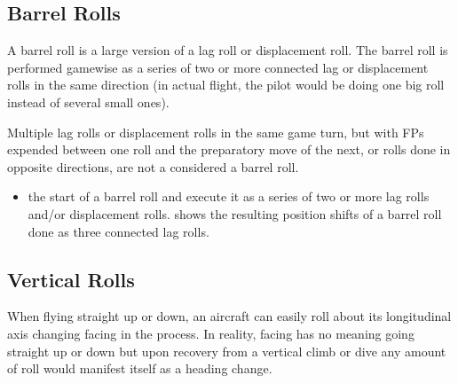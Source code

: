 \subsection{Barrel Rolls}


A barrel roll is a large version of a lag roll or displacement roll. The barrel roll is performed gamewise as a series of two or more connected lag or displacement rolls in the same direction (in actual flight, the pilot would be doing one big roll instead of several small ones).

Multiple lag rolls or displacement rolls in the same game turn, but with FPs expended between one roll and the preparatory move of the next, or rolls done in opposite directions, are not a considered a barrel roll.

\begin{itemize}
    \item{}  the start of a barrel roll and execute it as a series of two or more lag rolls and/or displacement rolls.  shows the resulting position shifts of a barrel roll done as three connected lag rolls.
\end{itemize}


\subsection{Vertical Rolls}
\label{rule:vertical-rolls}

When flying straight up or down, an aircraft can easily roll about its longitudinal axis changing facing in the process. In reality, facing has no meaning going straight up or down but upon recovery from a vertical climb or dive any amount of roll would manifest itself as a heading change.


